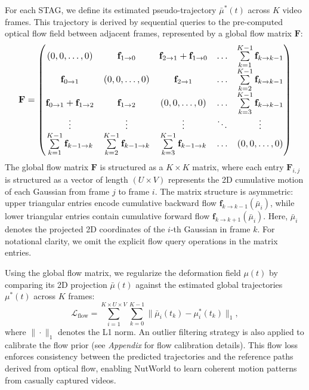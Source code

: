 For each STAG, we define its estimated pseudo-trajectory $\bar{\mu}^*(t)$ across $K$ video frames. This trajectory is derived by sequential queries to the pre-computed optical flow field between adjacent frames, represented by a global flow matrix \(\mathbf{F}\):
\vspace{-2mm}
\begin{equation}
\vspace{-1mm}
\resizebox{0.95\columnwidth}{!}{$
\mathbf{F} = \begin{pmatrix}
(0, 0, \dots, 0) & \mathbf{f}_{1 \to 0} & \mathbf{f}_{2 \to 1} + \mathbf{f}_{1 \to 0} & \dots & \sum\limits_{k=1}^{K-1} \mathbf{f}_{k \to k-1} \\
\mathbf{f}_{0 \to 1} & (0, 0, \dots, 0) & \mathbf{f}_{2 \to 1} & \dots & \sum\limits_{k=2}^{K-1} \mathbf{f}_{k \to k-1} \\
\mathbf{f}_{0 \to 1} + \mathbf{f}_{1 \to 2} & \mathbf{f}_{1 \to 2} & (0, 0, \dots, 0) & \dots & \sum\limits_{k=3}^{K-1} \mathbf{f}_{k \to k-1} \\
\vdots & \vdots & \vdots & \ddots & \vdots \\
\sum\limits_{k=1}^{K-1} \mathbf{f}_{k-1 \to k} & \sum\limits_{k=2}^{K-1} \mathbf{f}_{k-1 \to k} & \sum\limits_{k=3}^{K-1} \mathbf{f}_{k-1 \to k} & \dots & (0, 0, \dots, 0)
\end{pmatrix}
$}
\end{equation}
The global flow matrix $\mathbf{F}$ is structured as a $K \times K$ matrix, where each entry $\mathbf{F}_{i, j}$ is structured as a vector of length $(U \times V)$ represents the 2D cumulative motion of each Gaussian from frame $j$ to frame $i$. The matrix structure is asymmetric: upper triangular entries encode cumulative backward flow $\mathbf{f}_{k \to k-1}(\bar{\mu}_{i})$, while lower triangular entries contain cumulative forward flow $\mathbf{f}_{k \to k+1}(\bar{\mu}_{i})$. Here, $\bar{\mu}_{i}$ denotes the projected 2D coordinates of the $i$-th Gaussian in frame $k$. For notational clarity, we omit the explicit flow query operations in the matrix entries.

Using the global flow matrix, we regularize the deformation field $\mu(t)$ by comparing its 2D projection $\bar{\mu}(t)$ against the estimated global trajectories $\mu^*(t)$ across $K$ frames:
\begin{equation}
\mathcal{L}_{\text{flow}} = \sum_{i=1}^{K \times U \times V}\sum_{k=0}^{K-1} \|\bar{\mu}_{i}(t_k) - \mu^*_i(t_k)\|_1,
\label{eq:flow_prior}
\end{equation}
where $\|\cdot\|_1$ denotes the L1 norm. An outlier filtering strategy is also applied to calibrate the flow prior (see \textit{Appendix} for flow calibration details). This flow loss enforces consistency between the predicted trajectories and the reference paths derived from optical flow, enabling NutWorld to learn coherent motion patterns from casually captured videos.









